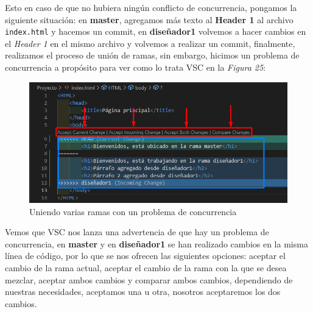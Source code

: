 Esto en caso de que no hubiera ningún conflicto de concurrencia, pongamos la siguiente situación: en \textbf{master}, agregamos más texto al \textbf{Header 1} al archivo \texttt{index.html} y hacemos un commit, en \textbf{diseñador1} volvemos a hacer cambios en el \textit{Header 1} en el mismo archivo y volvemos a realizar un commit, finalmente, realizamos el proceso de unión de ramas, sin embargo, hicimos un problema de concurrencia a propósito para ver como lo trata VSC en la \textit{Figura 25}:
\begin{figure}[H]
    \begin{center}
        \caption{Uniendo varias ramas con un problema de concurrencia}
        \label{fig: 25}
        \includegraphics[width=12cm]{capturas/merge3.png}
    \end{center}
\end{figure}

Vemos que VSC nos lanza una advertencia de que hay un problema de concurrencia, en \textbf{master} y en \textbf{diseñador1} se han realizado cambios en la misma línea de código, por lo que se nos ofrecen las siguientes opciones: aceptar el cambio de la rama actual, aceptar el cambio de la rama con la que se desea mezclar, aceptar ambos cambios y comparar ambos cambios, dependiendo de nuestras necesidades, aceptamos una u otra, nosotros aceptaremos los dos cambios.

